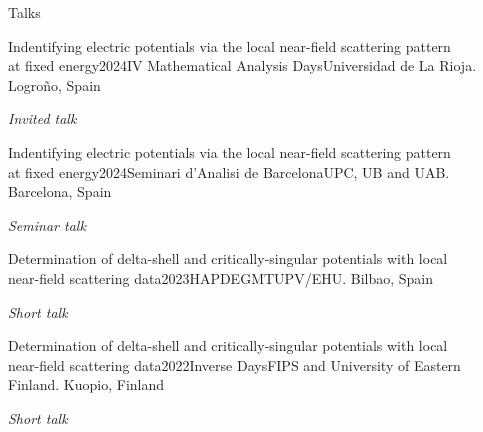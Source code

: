 \documentclass{resume} %
\newcommand{\italicitem}[1]{\item{\textit{#1}}}
\newcommand{\plainitem}[1]{\item{#1}}
\begin{document}
\begin{rSection}{Talks}
    \begin{rSubsectionNoBullet}{Indentifying electric potentials via the local
        near-field scattering pattern\\ at fixed energy}{2024}{IV Mathematical Analysis Days}{Universidad de La Rioja. Logroño, Spain}
        \italicitem {Invited talk}
    \end{rSubsectionNoBullet}\newpage
    \begin{rSubsectionNoBullet}{Indentifying electric potentials via the local
        near-field scattering pattern\\ at fixed energy}{2024}{Seminari d'Analisi de Barcelona}{UPC, UB and UAB. Barcelona, Spain}
        \italicitem {Seminar talk}
    \end{rSubsectionNoBullet}
    \begin{rSubsectionNoBullet}{Determination of delta-shell and critically-singular potentials
        with local \\near-field scattering data}{2023}{HAPDEGMT}{UPV/EHU. Bilbao, Spain}
        \italicitem {Short talk}
    \end{rSubsectionNoBullet}
    \begin{rSubsectionNoBullet}{Determination of delta-shell and critically-singular potentials
        with local \\near-field scattering data}{2022}{Inverse Days}{FIPS and University of Eastern Finland. Kuopio, Finland}
        \italicitem {Short talk}
    \end{rSubsectionNoBullet}
    
\end{rSection}

%
%
%
%
%
\end{document}
